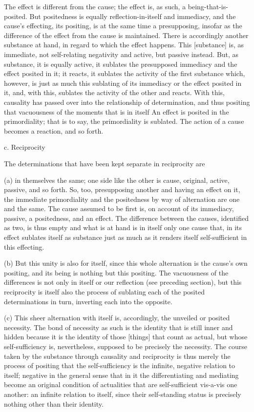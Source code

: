 The effect is different from the cause;
the effect is, as such, a being-that-is-posited.
But positedness is equally reflection-in-itself and immediacy, and
the cause's effecting, its positing, is at the same time a presupposing,
insofar as the difference of the effect from the cause is maintained.
There is accordingly another substance at hand,
in regard to which the effect happens.
This [substance] is, as immediate,
not self-relating negativity and active, but passive instead.
But, as substance, it is equally active,
it sublates the presupposed immediacy and the effect posited in it;
it reacts, it sublates the activity of the first substance which, however, is
just as much this sublating of its immediacy or
the effect posited in it, and, with this,
sublates the activity of the other and reacts.
With this, causality has passed over into the relationship of determination,
and thus positing that vacuousness of the moments that is in itself
An effect is posited in the primordiality;
that is to say, the primordiality is sublated.
The action of a cause becomes a reaction, and so forth.

c. Reciprocity

The determinations that have been kept separate in reciprocity are

(a) in themselves the same;
one side like the other is cause, original, active, passive, and so forth.
So, too, presupposing another and having an effect on it,
the immediate primordiality and the positedness
by way of alternation are one and the same.
The cause assumed to be first is,
on account of its immediacy,
passive, a positedness, and an effect.
The difference between the causes, identified as two,
is thus empty and what is at hand is
in itself only one cause that, in its effect sublates itself
as substance just as much as it renders itself
self-sufficient in this effecting.

(b) But this unity is also for itself,
since this whole alternation is the cause's own positing,
and its being is nothing but this positing.
The vacuousness of the differences is not only
in itself or our reflection (see preceding section),
but this reciprocity is itself also the process of sublating
each of the posited determinations in turn,
inverting each into the opposite.

(c) This sheer alternation with itself is, accordingly,
the unveiled or posited necessity.
The bond of necessity as such is
the identity that is still inner and hidden
because it is the identity of
those [things] that count as actual,
but whose self-sufficiency is, nevertheless,
supposed to be precisely the necessity.
The course taken by the substance through
causality and reciprocity is thus merely
the process of positing that the self-sufficiency is
the infinite, negative relation to itself;
negative in the general sense that in it
the differentiating and mediating become an
original condition of actualities that are
self-sufficient vis-a-vis one another:
an infinite relation to itself, since their self-standing
status is precisely nothing other than their identity.

